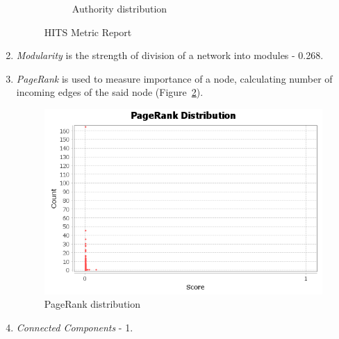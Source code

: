 \begin{enumerate}
\begin{figure}[H]
\begin{subfigure}{0.49\textwidth}
                \caption{Authority distribution}
            \end{subfigure}
            \caption{HITS Metric Report}
            \label{ris:hits}
        \end{figure}
    \item \textit{Modularity} is the strength of division of a network into modules - 0.268.
    \item \textit{PageRank} is used to measure importance of a node, calculating number of incoming edges of the said node (Figure~\ref{ris:pagerank}).
        \begin{figure}[H]
        \center
        \includegraphics[width=\textwidth]{img/pagerank.png}
        \caption{PageRank distribution}
        \label{ris:pagerank}
        \end{figure}
    \item \textit{Connected Components} - 1.
\end{enumerate}

